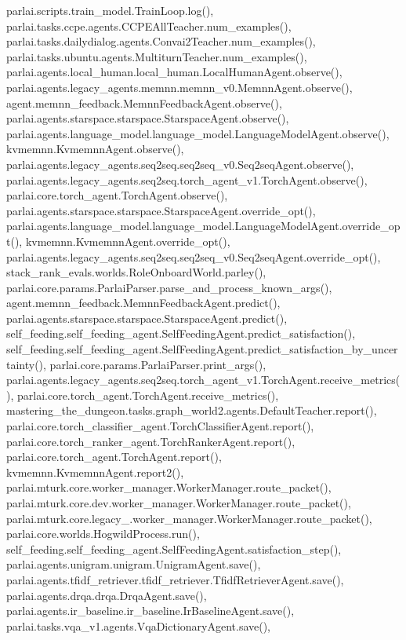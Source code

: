 parlai.\+scripts.\+train\+\_\+model.\+Train\+Loop.\+log(), parlai.\+tasks.\+ccpe.\+agents.\+C\+C\+P\+E\+All\+Teacher.\+num\+\_\+examples(), parlai.\+tasks.\+dailydialog.\+agents.\+Convai2\+Teacher.\+num\+\_\+examples(), parlai.\+tasks.\+ubuntu.\+agents.\+Multiturn\+Teacher.\+num\+\_\+examples(), parlai.\+agents.\+local\+\_\+human.\+local\+\_\+human.\+Local\+Human\+Agent.\+observe(), parlai.\+agents.\+legacy\+\_\+agents.\+memnn.\+memnn\+\_\+v0.\+Memnn\+Agent.\+observe(), agent.\+memnn\+\_\+feedback.\+Memnn\+Feedback\+Agent.\+observe(), parlai.\+agents.\+starspace.\+starspace.\+Starspace\+Agent.\+observe(), parlai.\+agents.\+language\+\_\+model.\+language\+\_\+model.\+Language\+Model\+Agent.\+observe(), kvmemnn.\+Kvmemnn\+Agent.\+observe(), parlai.\+agents.\+legacy\+\_\+agents.\+seq2seq.\+seq2seq\+\_\+v0.\+Seq2seq\+Agent.\+observe(), parlai.\+agents.\+legacy\+\_\+agents.\+seq2seq.\+torch\+\_\+agent\+\_\+v1.\+Torch\+Agent.\+observe(), parlai.\+core.\+torch\+\_\+agent.\+Torch\+Agent.\+observe(), parlai.\+agents.\+starspace.\+starspace.\+Starspace\+Agent.\+override\+\_\+opt(), parlai.\+agents.\+language\+\_\+model.\+language\+\_\+model.\+Language\+Model\+Agent.\+override\+\_\+opt(), kvmemnn.\+Kvmemnn\+Agent.\+override\+\_\+opt(), parlai.\+agents.\+legacy\+\_\+agents.\+seq2seq.\+seq2seq\+\_\+v0.\+Seq2seq\+Agent.\+override\+\_\+opt(), stack\+\_\+rank\+\_\+evals.\+worlds.\+Role\+Onboard\+World.\+parley(), parlai.\+core.\+params.\+Parlai\+Parser.\+parse\+\_\+and\+\_\+process\+\_\+known\+\_\+args(), agent.\+memnn\+\_\+feedback.\+Memnn\+Feedback\+Agent.\+predict(), parlai.\+agents.\+starspace.\+starspace.\+Starspace\+Agent.\+predict(), self\+\_\+feeding.\+self\+\_\+feeding\+\_\+agent.\+Self\+Feeding\+Agent.\+predict\+\_\+satisfaction(), self\+\_\+feeding.\+self\+\_\+feeding\+\_\+agent.\+Self\+Feeding\+Agent.\+predict\+\_\+satisfaction\+\_\+by\+\_\+uncertainty(), parlai.\+core.\+params.\+Parlai\+Parser.\+print\+\_\+args(), parlai.\+agents.\+legacy\+\_\+agents.\+seq2seq.\+torch\+\_\+agent\+\_\+v1.\+Torch\+Agent.\+receive\+\_\+metrics(), parlai.\+core.\+torch\+\_\+agent.\+Torch\+Agent.\+receive\+\_\+metrics(), mastering\+\_\+the\+\_\+dungeon.\+tasks.\+graph\+\_\+world2.\+agents.\+Default\+Teacher.\+report(), parlai.\+core.\+torch\+\_\+classifier\+\_\+agent.\+Torch\+Classifier\+Agent.\+report(), parlai.\+core.\+torch\+\_\+ranker\+\_\+agent.\+Torch\+Ranker\+Agent.\+report(), parlai.\+core.\+torch\+\_\+agent.\+Torch\+Agent.\+report(), kvmemnn.\+Kvmemnn\+Agent.\+report2(), parlai.\+mturk.\+core.\+worker\+\_\+manager.\+Worker\+Manager.\+route\+\_\+packet(), parlai.\+mturk.\+core.\+dev.\+worker\+\_\+manager.\+Worker\+Manager.\+route\+\_\+packet(), parlai.\+mturk.\+core.\+legacy\+\_.\+worker\+\_\+manager.\+Worker\+Manager.\+route\+\_\+packet(), parlai.\+core.\+worlds.\+Hogwild\+Process.\+run(), self\+\_\+feeding.\+self\+\_\+feeding\+\_\+agent.\+Self\+Feeding\+Agent.\+satisfaction\+\_\+step(), parlai.\+agents.\+unigram.\+unigram.\+Unigram\+Agent.\+save(), parlai.\+agents.\+tfidf\+\_\+retriever.\+tfidf\+\_\+retriever.\+Tfidf\+Retriever\+Agent.\+save(), parlai.\+agents.\+drqa.\+drqa.\+Drqa\+Agent.\+save(), parlai.\+agents.\+ir\+\_\+baseline.\+ir\+\_\+baseline.\+Ir\+Baseline\+Agent.\+save(), parlai.\+tasks.\+vqa\+\_\+v1.\+agents.\+Vqa\+Dictionary\+Agent.\+save(), 